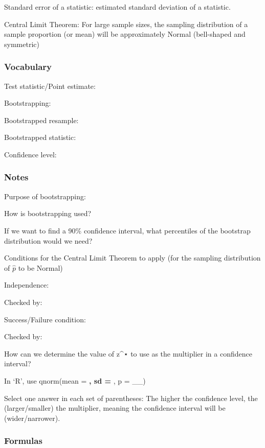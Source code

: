 \documentclass[
]{report}
\newcommand{\rgs}{\vspace{12pt}} %
\newcommand{\rgi}{\hspace{24pt}}  %
\begin{document}
Standard error of a statistic: estimated standard deviation of a statistic.

Central Limit Theorem: For large sample sizes, the sampling distribution of a sample proportion (or mean) will be approximately Normal (bell-shaped and symmetric)

\hypertarget{vocabulary-14}{%
\subsubsection*{Vocabulary}\label{vocabulary-14}}

Test statistic/Point estimate:
\rgs

Bootstrapping:
\rgs

Bootstrapped resample:
\rgs

Bootstrapped statistic:
\rgs

Confidence level:
\rgs

\hypertarget{notes-18}{%
\subsubsection*{Notes}\label{notes-18}}

Purpose of bootstrapping:
\rgs

How is bootstrapping used?\\
\rgs

If we want to find a 90\% confidence interval, what percentiles of the bootstrap distribution would we need?\\
\rgs

Conditions for the Central Limit Theorem to apply (for the sampling distribution of \(\hat{p}\) to be Normal)

\rgi Independence:
\rgs

\rgi Checked by:
\rgs

\rgi Success/Failure condition:
\rgs

\rgi Checked by:
\rgs

How can we determine the value of z\^{}⋆ to use as the multiplier in a confidence interval?
\rgs

\rgi In `R', use qnorm(mean = \textbf{, sd = }, p = \_\_)

Select one answer in each set of parentheses: The higher the confidence level, the (larger/smaller) the multiplier, meaning the confidence interval will be (wider/narrower).

\hypertarget{formulas-4}{%
\subsubsection*{Formulas}\label{formulas-4}}
\end{document}
